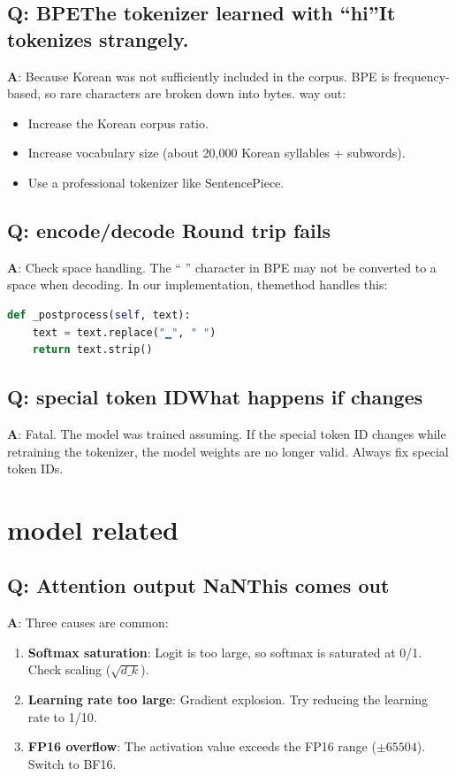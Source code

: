 \subsection{Q: BPEThe tokenizer learned with ``hi''It tokenizes strangely.}

\textbf{A}: Because Korean was not sufficiently included in the corpus. BPE is frequency-based, so rare characters are broken down into bytes. way out:
\begin{itemize}
\item Increase the Korean corpus ratio.
\item Increase vocabulary size (about 20,000 Korean syllables + subwords).
\item Use a professional tokenizer like SentencePiece.
\end{itemize}

\subsection{Q: encode/decode Round trip fails}

\textbf{A}: Check space handling. The `` '' character in BPE may not be converted to a space when decoding. In our implementation, themethod handles this:

\begin{lstlisting}[language=Python]
def _postprocess(self, text):
    text = text.replace("▁", " ")
    return text.strip()
\end{lstlisting}

\subsection{Q: special token IDWhat happens if changes}

\textbf{A}: Fatal. The model was trained assuming. If the special token ID changes while retraining the tokenizer, the model weights are no longer valid. Always fix special token IDs.

\section{model related}

\subsection{Q: Attention output NaNThis comes out}

\textbf{A}: Three causes are common:
\begin{enumerate}
\item\textbf{Softmax saturation}: Logit is too large, so softmax is saturated at 0/1. Check scaling ($\sqrt{d\_k}$).
\item\textbf{Learning rate too large}: Gradient explosion. Try reducing the learning rate to 1/10.
\item\textbf{FP16 overflow}: The activation value exceeds the FP16 range ($\pm 65504$). Switch to BF16.
\end{enumerate}

